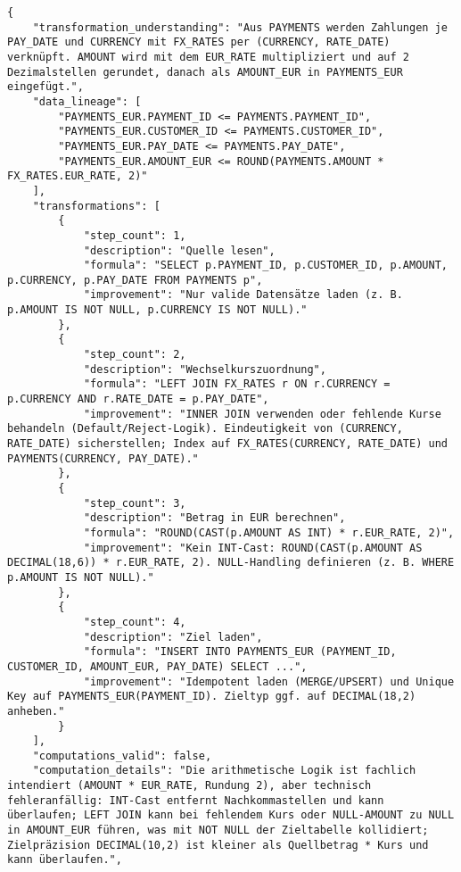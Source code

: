 \begin{lstlisting}[caption={Ausgabe: GPT-5 Anwendungsfall 4 Hauptdurchlauf},label={gpt_case4_prompt1}]
{
    "transformation_understanding": "Aus PAYMENTS werden Zahlungen je PAY_DATE und CURRENCY mit FX_RATES per (CURRENCY, RATE_DATE) verknüpft. AMOUNT wird mit dem EUR_RATE multipliziert und auf 2 Dezimalstellen gerundet, danach als AMOUNT_EUR in PAYMENTS_EUR eingefügt.",
    "data_lineage": [
        "PAYMENTS_EUR.PAYMENT_ID <= PAYMENTS.PAYMENT_ID",
        "PAYMENTS_EUR.CUSTOMER_ID <= PAYMENTS.CUSTOMER_ID",
        "PAYMENTS_EUR.PAY_DATE <= PAYMENTS.PAY_DATE",
        "PAYMENTS_EUR.AMOUNT_EUR <= ROUND(PAYMENTS.AMOUNT * FX_RATES.EUR_RATE, 2)"
    ],
    "transformations": [
        {
            "step_count": 1,
            "description": "Quelle lesen",
            "formula": "SELECT p.PAYMENT_ID, p.CUSTOMER_ID, p.AMOUNT, p.CURRENCY, p.PAY_DATE FROM PAYMENTS p",
            "improvement": "Nur valide Datensätze laden (z. B. p.AMOUNT IS NOT NULL, p.CURRENCY IS NOT NULL)."
        },
        {
            "step_count": 2,
            "description": "Wechselkurszuordnung",
            "formula": "LEFT JOIN FX_RATES r ON r.CURRENCY = p.CURRENCY AND r.RATE_DATE = p.PAY_DATE",
            "improvement": "INNER JOIN verwenden oder fehlende Kurse behandeln (Default/Reject-Logik). Eindeutigkeit von (CURRENCY, RATE_DATE) sicherstellen; Index auf FX_RATES(CURRENCY, RATE_DATE) und PAYMENTS(CURRENCY, PAY_DATE)."
        },
        {
            "step_count": 3,
            "description": "Betrag in EUR berechnen",
            "formula": "ROUND(CAST(p.AMOUNT AS INT) * r.EUR_RATE, 2)",
            "improvement": "Kein INT-Cast: ROUND(CAST(p.AMOUNT AS DECIMAL(18,6)) * r.EUR_RATE, 2). NULL-Handling definieren (z. B. WHERE p.AMOUNT IS NOT NULL)."
        },
        {
            "step_count": 4,
            "description": "Ziel laden",
            "formula": "INSERT INTO PAYMENTS_EUR (PAYMENT_ID, CUSTOMER_ID, AMOUNT_EUR, PAY_DATE) SELECT ...",
            "improvement": "Idempotent laden (MERGE/UPSERT) und Unique Key auf PAYMENTS_EUR(PAYMENT_ID). Zieltyp ggf. auf DECIMAL(18,2) anheben."
        }
    ],
    "computations_valid": false,
    "computation_details": "Die arithmetische Logik ist fachlich intendiert (AMOUNT * EUR_RATE, Rundung 2), aber technisch fehleranfällig: INT-Cast entfernt Nachkommastellen und kann überlaufen; LEFT JOIN kann bei fehlendem Kurs oder NULL-AMOUNT zu NULL in AMOUNT_EUR führen, was mit NOT NULL der Zieltabelle kollidiert; Zielpräzision DECIMAL(10,2) ist kleiner als Quellbetrag * Kurs und kann überlaufen.",

\end{lstlisting}
